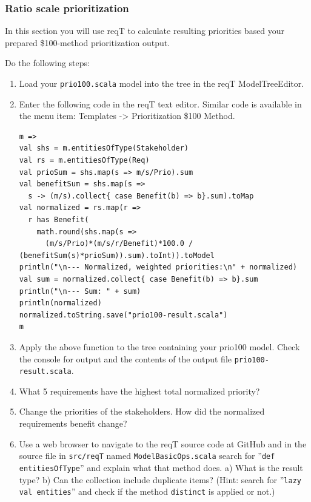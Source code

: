 \documentclass[11pt]{article}
\begin{document}
\subsubsection{Ratio scale prioritization}
In this section you will use reqT to calculate resulting priorities based your prepared \$100-method prioritization output. 
\begin{framed}
\noindent Do the following steps: 

\begin{enumerate}
\item Load your \verb+prio100.scala+ model into the tree in the reqT ModelTreeEditor.
\item Enter the following code in the reqT text editor. Similar code is available in the menu item:  Templates -> Prioritization \$100 Method.
\begin{lstlisting}
m =>    
val shs = m.entitiesOfType(Stakeholder)
val rs = m.entitiesOfType(Req)
val prioSum = shs.map(s => m/s/Prio).sum
val benefitSum = shs.map(s => 
  s -> (m/s).collect{ case Benefit(b) => b}.sum).toMap
val normalized = rs.map(r => 
  r has Benefit(
    math.round(shs.map(s => 
      (m/s/Prio)*(m/s/r/Benefit)*100.0 / (benefitSum(s)*prioSum)).sum).toInt)).toModel
println("\n--- Normalized, weighted priorities:\n" + normalized)
val sum = normalized.collect{ case Benefit(b) => b}.sum
println("\n--- Sum: " + sum)
println(normalized)
normalized.toString.save("prio100-result.scala")
m 
\end{lstlisting}
\item Apply the above function to the tree containing your prio100 model. Check the console for output and the contents of the output file \Verb+prio100-result.scala+.
\item What 5 requirements have the highest total normalized priority?
\vspace{4em}
\item Change the priorities of the stakeholders. How did the normalized requirements benefit change?
\vspace{4em}
\item Use a web browser to navigate to the reqT source code at GitHub and in the source file in \verb+src/reqT+ named \verb+ModelBasicOps.scala+ search for ''\verb+def entitiesOfType+'' and explain what that method does. \newline a) What is the result type? \vspace{1em}\newline b) Can the collection include duplicate items? (Hint: search for ''\verb+lazy val entities+'' and check if the method \verb+distinct+ is applied or not.)

\end{enumerate}
\end{framed}
\end{document}
